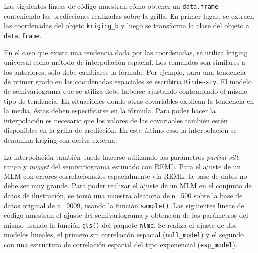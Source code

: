 \documentclass[11pt,b5paper,]{krantz}
\newenvironment{Shaded}{}{}
\newcommand{\KeywordTok}[1]{\textcolor[rgb]{0.00,0.44,0.13}{\textbf{#1}}}
\newcommand{\DecValTok}[1]{\textcolor[rgb]{0.25,0.63,0.44}{#1}}
\newcommand{\StringTok}[1]{\textcolor[rgb]{0.25,0.44,0.63}{#1}}
\newcommand{\OperatorTok}[1]{\textcolor[rgb]{0.40,0.40,0.40}{#1}}
\newcommand{\NormalTok}[1]{#1}
\begin{document}
Las siguientes líneas de código muestran cómo obtener un
\texttt{data.frame} conteniendo las predicciones realizadas sobre la
grilla. En primer lugar, se extraen las coordenadas del objeto
\texttt{kriging\_b} y luego se transforma la clase del objeto a
\texttt{data.frame}.

\begin{Shaded}
\end{Shaded}

En el caso que exista una tendencia dada por las coordenadas, se utiliza
kriging universal como método de interpolación espacial. Los comandos
son similares a los anteriores, sólo debe cambiarse la fórmula. Por
ejemplo, para una tendencia de primer grado en las coordenadas
espaciales se escribiría \texttt{Rinde\textasciitilde{}x+y}. El modelo
de semivariograma que se utiliza debe haberse ajustando contemplado el
mismo tipo de tendencia. En situaciones donde otras covariables explican
la tendencia en la media, éstas deben especificarse en la fórmula. Para
poder hacer la interpolación es necesario que los valores de las
covariables también estén disponibles en la grilla de predicción. En
este último caso la interpolación se denomina kriging con deriva
externa.

La interpolación también puede hacerse utilizando los parámetros
\emph{partial sill}, rango y \emph{nugget} del semivariograma estimado
con REML. Para el ajuste de un MLM con errores correlacionados
espacialmente vía REML, la base de datos no debe ser muy grande. Para
poder realizar el ajuste de un MLM en el conjunto de datos de
ilustración, se tomó una muestra aleatoria de n=500 sobre la base de
datos original de n=9009, usando la función \texttt{sample()}. Las
siguientes líneas de código muestran el ajuste del semivariograma y
obtención de los parámetros del mismo usando la función \texttt{gls()}
del paquete \texttt{nlme}. Se realiza el ajuste de dos modelos lineales,
el primero sin correlación espacial (\texttt{null\_model}) y el segundo
con una estructura de correlación espacial del tipo exponencial
(\texttt{esp\_model}).
\end{document}
